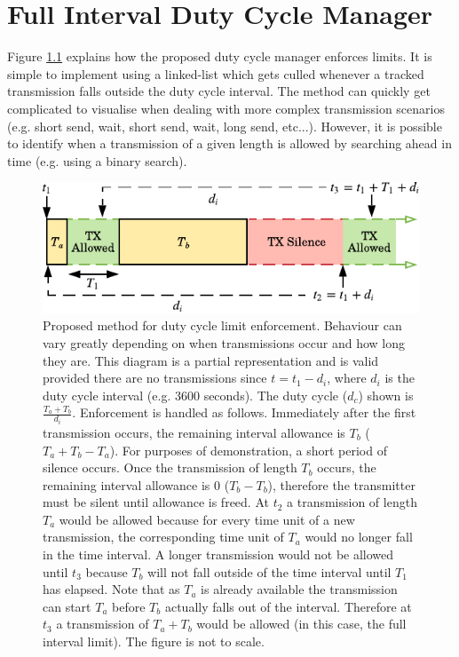 \chapter{Full Interval Duty Cycle Manager}\label{sec:proposed_duty_cycle}
Figure \ref{fig:proposed_duty_cycle} explains how the proposed duty cycle manager enforces limits. It is simple to implement using a linked-list which gets culled whenever a tracked transmission falls outside the duty cycle interval. The method can quickly get complicated to visualise when dealing with more complex transmission scenarios  (e.g. short send, wait, short send, wait, long send, etc...). However, it is possible to identify when a transmission of a given length is allowed by searching ahead in time (e.g. using a binary search).
\begin{figure}[H]
    \centering
   	\includegraphics{Figures/duty_cycle_proposed}
    \caption[Proposed duty cycle enforcement method]{
    Proposed method for duty cycle limit enforcement. Behaviour can vary greatly depending on when transmissions occur and how long they are. This diagram is a partial representation and is valid provided there are no transmissions since $t=t_1-d_i$, where $d_i$ is the duty cycle interval (e.g. 3600 seconds). The duty cycle ($d_c$) shown is $\frac{T_a + T_b}{d_i}$. Enforcement is handled as follows. Immediately after the first transmission occurs, the remaining interval allowance is $T_b$ ($T_a+T_b-T_a$). For purposes of demonstration, a short period of silence occurs. Once the transmission of length $T_b$ occurs, the remaining interval allowance is 0 ($T_b - T_b$), therefore the transmitter must be silent until allowance is freed. At $t_2$ a transmission of length $T_a$ would be allowed because for every time unit of a new transmission, the corresponding time unit of $T_a$ would no longer fall in the time interval. A longer transmission would not be allowed until $t_3$ because $T_b$ will not fall outside of the time interval until $T_1$ has elapsed. Note that as $T_a$ is already available the transmission can start $T_a$ before $T_b$ actually falls out of the interval. Therefore at $t_3$ a transmission of $T_a + T_b$ would be allowed (in this case, the full interval limit). The figure is not to scale.    
    }
    \label{fig:proposed_duty_cycle}
\end{figure}

